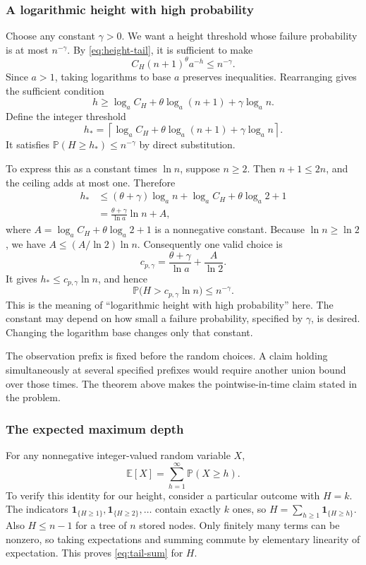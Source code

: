 \documentclass[11pt,a4paper]{article}
\theoremstyle{readable}
\newcommand{\E}{\mathbb E}
\newcommand{\Prob}{\mathbb P}
\newcommand{\ceil}[1]{\left\lceil #1\right\rceil}
\newcommand{\ind}[1]{\mathbf 1_{\{#1\}}}
\begin{document}
\subsubsection*{A logarithmic height with high probability}
Choose any constant $\gamma>0$. We want a height threshold whose
failure probability is at most $n^{-\gamma}$. By
\eqref{eq:height-tail}, it is sufficient to make
\[
  C_H(n+1)^\theta a^{-h}\le n^{-\gamma}.
\]
Since $a>1$, taking logarithms to base $a$ preserves inequalities.
Rearranging gives the sufficient condition
\[
  h\ge\log_a C_H+\theta\log_a(n+1)+\gamma\log_a n.
\]
Define the integer threshold
\[
  h_*=
  \ceil{\log_a C_H+\theta\log_a(n+1)+\gamma\log_a n}.
\]
It satisfies $\Prob(H\ge h_*)\le n^{-\gamma}$ by direct substitution.

To express this as a constant times $\ln n$, suppose $n\ge2$.
Then $n+1\le2n$, and the ceiling adds at most one. Therefore
\begin{align*}
  h_*
   &\le(\theta+\gamma)\log_a n
       +\log_a C_H+\theta\log_a2+1\\
   &=\frac{\theta+\gamma}{\ln a}\ln n+A,
\end{align*}
where $A=\log_a C_H+\theta\log_a2+1$ is a nonnegative constant.
Because $\ln n\ge\ln2$, we have $A\le(A/\ln2)\ln n$. Consequently
one valid choice is
\[
  c_{p,\gamma}
    =\frac{\theta+\gamma}{\ln a}+\frac{A}{\ln2}.
\]
It gives $h_*\le c_{p,\gamma}\ln n$, and hence
\begin{equation}
  \Prob\bigl(H>c_{p,\gamma}\ln n\bigr)\le n^{-\gamma}.
  \label{eq:whp}
\end{equation}
This is the meaning of ``logarithmic height with high probability''
here. The constant may depend on how small a failure probability,
specified by $\gamma$, is desired. Changing the logarithm base changes
only that constant.

The observation prefix is fixed before the random choices. A claim
holding simultaneously at several specified prefixes would require
another union bound over those times. The theorem above makes the
pointwise-in-time claim stated in the problem.

\subsubsection*{The expected maximum depth}
For any nonnegative integer-valued random variable $X$,
\begin{equation}
  \E[X]=\sum_{h=1}^\infty\Prob(X\ge h).
  \label{eq:tail-sum}
\end{equation}
To verify this identity for our height, consider a particular outcome
with $H=k$. The indicators
$\ind{H\ge1},\ind{H\ge2},\ldots$ contain exactly $k$ ones, so
$H=\sum_{h\ge1}\ind{H\ge h}$. Also $H\le n-1$ for a tree of
$n$ stored nodes. Only finitely many terms can be nonzero, so taking
expectations and summing commute by elementary linearity of expectation.
This proves \eqref{eq:tail-sum} for $H$.
\end{document}
